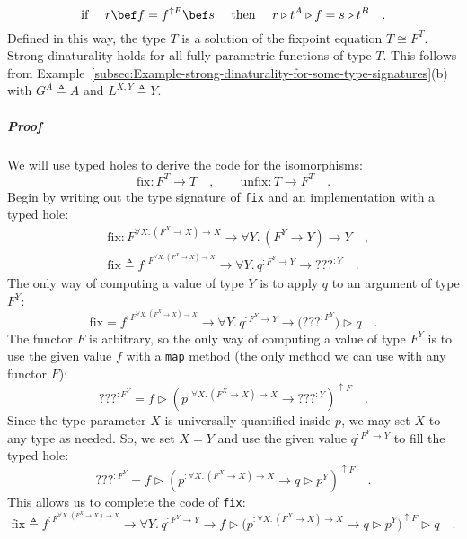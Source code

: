 \begin{equation}
\text{if }\quad r\bef f=f^{\uparrow F}\bef s\quad\text{ then }\quad r\triangleright t^{A}\triangleright f=s\triangleright t^{B}\quad.\label{eq:strong-dinaturality-for-church-encoded-fix-unfix}
\end{equation}
Defined in this way, the type $T$ is a solution of the fixpoint equation
$T\cong F^{T}$. Strong dinaturality holds for all fully parametric
functions of type $T$. This follows from Example~\ref{subsec:Example-strong-dinaturality-for-some-type-signatures}(b)
with $G^{A}\triangleq A$ and $L^{X,Y}\triangleq Y$.

\subparagraph{Proof}

We will use typed holes to derive the code for the isomorphisms:
\[
\text{fix}:F^{T}\rightarrow T\quad,\quad\quad\text{unfix}:T\rightarrow F^{T}\quad.
\]
Begin by writing out the type signature of \lstinline!fix!
and an implementation with a typed hole:
\begin{align*}
 & \text{fix}:F^{\forall X.\,(F^{X}\rightarrow X)\rightarrow X}\rightarrow\forall Y.\,(F^{Y}\rightarrow Y)\rightarrow Y\quad,\\
 & \text{fix}\triangleq f^{:F^{\forall X.\,(F^{X}\rightarrow X)\rightarrow X}}\rightarrow\forall Y.\,q^{:F^{Y}\rightarrow Y}\rightarrow\text{???}^{:Y}\quad.
\end{align*}
The only way of computing a value of type $Y$ is to apply $q$ to
an argument of type $F^{Y}$:
\[
\text{fix}=f^{:F^{\forall X.\,(F^{X}\rightarrow X)\rightarrow X}}\rightarrow\forall Y.\,q^{:F^{Y}\rightarrow Y}\rightarrow\big(\text{???}^{:F^{Y}}\big)\triangleright q\quad.
\]
The functor $F$ is arbitrary, so the only way of computing a value
of type $F^{Y}$ is to use the given value $f$ with a \lstinline!map!
method (the only method we can use with any functor $F$):
\[
\text{???}^{:F^{Y}}=f\triangleright(p^{:\forall X.\,(F^{X}\rightarrow X)\rightarrow X}\rightarrow\text{???}^{:Y})^{\uparrow F}\quad.
\]
Since the type parameter $X$ is universally quantified inside $p$,
we may set $X$ to any type as needed. So, we set $X=Y$ and use the
given value $q^{:F^{Y}\rightarrow Y}$ to fill the typed hole:
\[
\text{???}^{:F^{Y}}=f\triangleright(p^{:\forall X.\,(F^{X}\rightarrow X)\rightarrow X}\rightarrow q\triangleright p^{Y})^{\uparrow F}\quad.
\]
This allows us to complete the code of \lstinline!fix!:
\[
\text{fix}\triangleq f^{:F^{\forall X.\,(F^{X}\rightarrow X)\rightarrow X}}\rightarrow\forall Y.\,q^{:F^{Y}\rightarrow Y}\rightarrow f\triangleright\big(p^{:\forall X.\,(F^{X}\rightarrow X)\rightarrow X}\rightarrow q\triangleright p^{Y}\big)^{\uparrow F}\triangleright q\quad.
\]

